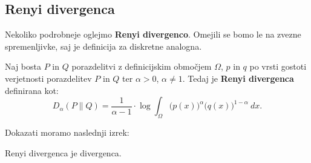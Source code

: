 \subsection{Renyi divergenca}

Nekoliko podrobneje oglejmo \textbf{Renyi divergenco}. Omejili se bomo le na zvezne spremenljivke, saj je definicija za diskretne analogna.


\begin{definicija}
	Naj bosta $P$ in $Q$ porazdelitvi z definicijskim območjem $\Omega$, $p$ in $q$ po vrsti gostoti verjetnosti porazdelitev $P$ in $Q$ ter $\alpha > 0$, $\alpha \neq 1$. Tedaj je \textbf{Renyi divergenca} definirana kot:
	\begin{equation}
		D_{\alpha}(P \| Q)=\frac{1}{\alpha-1} \cdot \log \int_{\Omega} \Big(p(x)\Big)^{\alpha}\Big(q(x)\Big)^{1-\alpha}\  dx.
	\end{equation}
\end{definicija}

Dokazati moramo naslednji izrek:

\begin{izrek}
	Renyi divergenca je divergenca.
\end{izrek}

